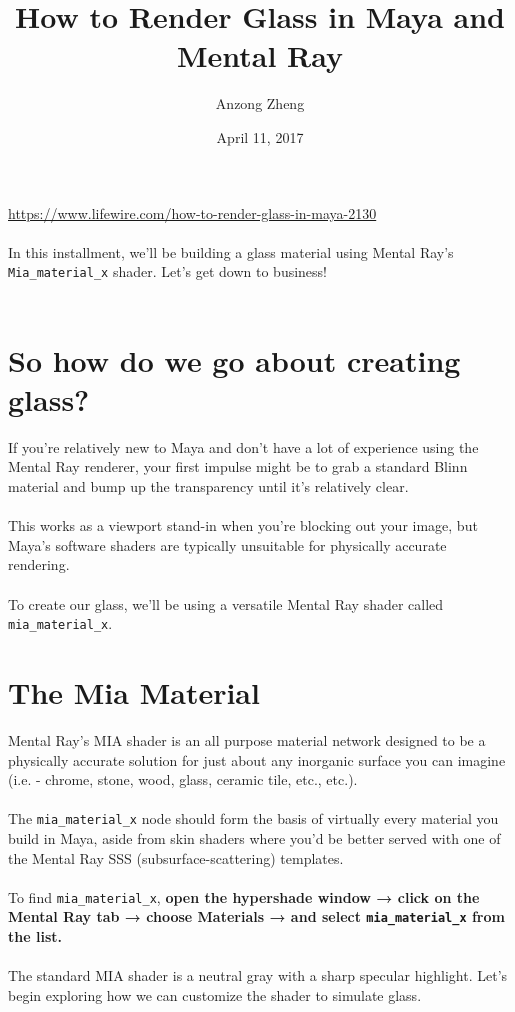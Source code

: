 \documentclass[10pt,a4paper]{article}
\begin{document}
\author{Anzong Zheng}
\title{How to Render Glass in Maya and Mental Ray}
\date{April 11, 2017}
\maketitle

\tableofcontents

\newpage\clearpage\setcounter{page}{1}

\url{https://www.lifewire.com/how-to-render-glass-in-maya-2130}
\\
\\
In this installment, we'll be building a glass material using Mental Ray's \lstinline{Mia_material_x} shader. Let's get down to business!
\\
\\
\section{So how do we go about creating glass?}
If you're relatively new to Maya and don't have a lot of experience using the Mental Ray renderer, your first impulse might be to grab a standard Blinn material and bump up the transparency until it's relatively clear.
\\
\\
This works as a viewport stand-in when you're blocking out your image, but Maya's software shaders are typically unsuitable for physically accurate rendering.
\\
\\
To create our glass, we'll be using a versatile Mental Ray shader called \lstinline{mia_material_x}.

\section{The Mia Material}
Mental Ray's MIA shader is an all purpose material network designed to be a physically accurate solution for just about any inorganic surface you can imagine (i.e. - chrome, stone, wood, glass, ceramic tile, etc., etc.).
\\
\\
The \lstinline{mia_material_x} node should form the basis of virtually every material you build in Maya, aside from skin shaders where you'd be better served with one of the Mental Ray SSS (subsurface-scattering) templates.
\\
\\
To find \lstinline{mia_material_x}, \textbf{open the hypershade window → click on the Mental Ray tab → choose Materials → and select \lstinline{mia_material_x} from the list.}
\\
\\
The standard MIA shader is a neutral gray with a sharp specular highlight. Let's begin exploring how we can customize the shader to simulate glass.
\end{document}
